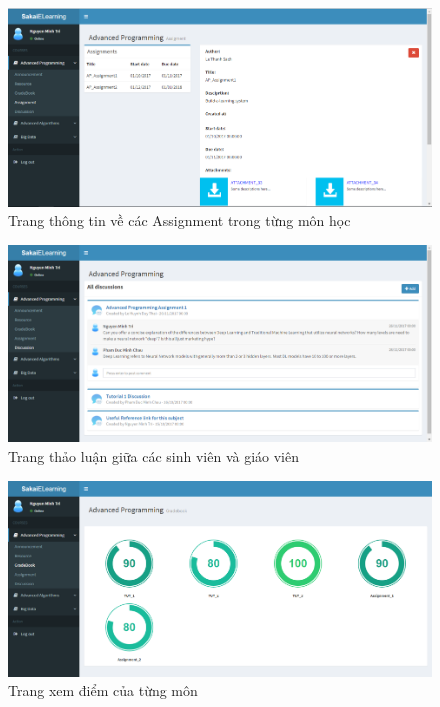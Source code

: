 \documentclass[12pt]{article}
\begin{document}
\begin{figure}[H]
\centering
\includegraphics[scale = 1]{sakai3.png}
\caption{Trang thông tin về các Assignment trong từng môn học}
\end{figure}

\begin{figure}[H]
\centering
\includegraphics[scale = 1]{sakai4.png}
\caption{Trang thảo luận giữa các sinh viên và giáo viên}
\end{figure}

\begin{figure}[H]
\centering
\includegraphics[scale = 1]{sakai5.png}
\caption{Trang xem điểm của từng môn }
\end{figure}
\end{document}
